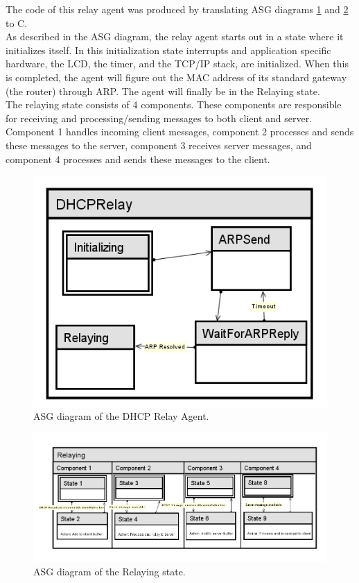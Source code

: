 \documentclass[11pt,a4paper]{scrartcl}
\begin{document}
The code of this relay agent was produced by translating ASG diagrams \ref{fig:asg} and \ref{fig:asgRelaying} to C.\\

As described in the ASG diagram, the relay agent starts out in a state where it initializes itself. In this initialization state interrupts and application specific hardware, the LCD, the timer, and the TCP/IP stack, are initialized. When this is completed, the agent will figure out the MAC address of its standard gateway (the router) through ARP. The agent will finally be in the Relaying state.\\

The relaying state consists of 4 components. These components are responsible for receiving and processing/sending messages to both client and server. Component 1 handles incoming client messages, component 2 processes and sends these messages to the server, component 3 receives server messages, and component 4 processes and sends these messages to the client.

\begin{figure}
	\centering
	\includegraphics[width=1.0\textwidth]{../img/dhcprelay-asg.png}
	\caption{ASG diagram of the DHCP Relay Agent.\label{fig:asg}}
\end{figure}

\begin{figure}
	\centering
	\includegraphics[width=1.0\textwidth]{../img/relaying-asg.png}
	\caption{ASG diagram of the Relaying state.\label{fig:asgRelaying}}
\end{figure}
\end{document}
